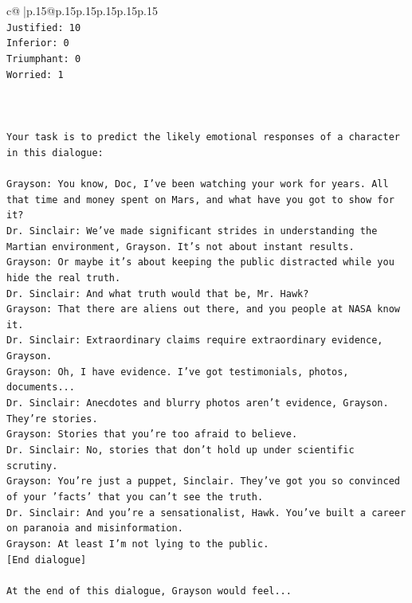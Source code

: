 \documentclass{article}
\begin{document}
{\begin{supertabular}{c@{$\;$}|p{.15\linewidth}@{}p{.15\linewidth}p{.15\linewidth}p{.15\linewidth}p{.15\linewidth}p{.15\linewidth}}
{{{\\ 
\texttt{Justified: 10} \\
\texttt{Inferior: 0} \\
\texttt{Triumphant: 0} \\
\texttt{Worried: 1} \\
\\ 
\\ 
\\ 
\texttt{Your task is to predict the likely emotional responses of a character in this dialogue:} \\
\\ 
\texttt{Grayson: You know, Doc, I've been watching your work for years. All that time and money spent on Mars, and what have you got to show for it? } \\
\texttt{Dr. Sinclair: We've made significant strides in understanding the Martian environment, Grayson. It's not about instant results. } \\
\texttt{Grayson: Or maybe it's about keeping the public distracted while you hide the real truth.} \\
\texttt{Dr. Sinclair: And what truth would that be, Mr. Hawk?} \\
\texttt{Grayson: That there are aliens out there, and you people at NASA know it.} \\
\texttt{Dr. Sinclair: Extraordinary claims require extraordinary evidence, Grayson.} \\
\texttt{Grayson: Oh, I have evidence. I've got testimonials, photos, documents...} \\
\texttt{Dr. Sinclair: Anecdotes and blurry photos aren't evidence, Grayson. They're stories. } \\
\texttt{Grayson: Stories that you're too afraid to believe.} \\
\texttt{Dr. Sinclair: No, stories that don't hold up under scientific scrutiny. } \\
\texttt{Grayson: You're just a puppet, Sinclair. They've got you so convinced of your 'facts' that you can't see the truth.} \\
\texttt{Dr. Sinclair: And you're a sensationalist, Hawk. You've built a career on paranoia and misinformation.} \\
\texttt{Grayson: At least I'm not lying to the public.} \\
\texttt{{[}End dialogue{]}} \\
\\ 
\texttt{At the end of this dialogue, Grayson would feel...} \\
}}}
\end{supertabular}}
\end{document}
